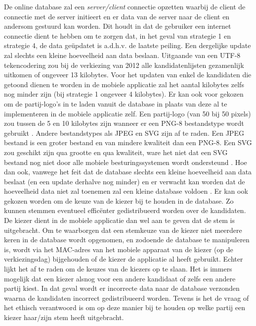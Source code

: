 De online database zal een \textit{server/client} \citep{Chapt17:online} connectie opzetten waarbij de client de connectie met de server initieert en er data van de server naar de client en andersom gestuurd kan worden. Dit houdt in dat de gebruiker een internet connectie dient te hebben om te zorgen dat, in het geval van strategie 1 en strategie 4, de data ge\"{u}pdatet is a.d.h.v. de laatste peiling. Een dergelijke update zal slechts een kleine hoeveelheid aan data beslaan. Uitgaande van een UTF-8 tekencodering \citep{yergeau2003utf} zou bij de verkiezing van 2012 alle kandidatenlijsten gezamenlijk uitkomen of ongeveer 13 kilobytes. Voor het updaten van enkel de kandidaten die getoond dienen te worden in de mobiele applicatie zal het aantal kilobytes zelfs nog minder zijn (bij strategie 1 ongeveer 4 kilobytes). Er kan ook voor gekozen om de partij-logo's in te laden vanuit de database in plaats van deze al te implementeren in de mobiele applicatie zelf.  Een partij-logo (van 50 bij 50 pixels) zou tussen de 5 en 10 kilobytes zijn wanneer er een PNG-8 bestandstype wordt gebruikt \citep{image39:online,miano1999compressed}. Andere bestandstypes als JPEG en SVG zijn af te raden. Een JPEG bestand is een groter bestand en van mindere kwaliteit dan een PNG-8. Een SVG zou geschikt zijn qua grootte en qua kwaliteit, ware het niet dat een SVG bestand nog niet door alle mobiele besturingssystemen wordt ondersteund \citep{CanIu25:online}. Hoe dan ook, vanwege het feit dat de database slechts een kleine hoeveelheid aan data beslaat (en een update derhalve nog minder) en er verwacht kan worden dat de hoeveelheid data niet zal toenemen zal een kleine database voldoen \citep{silberschatz1997database}. Er kan ook gekozen worden om de keuze van de kiezer bij te houden in de database. Zo kunnen stemmen eventueel effic\"{e}nter gedistribueerd worden over de kandidaten. De kiezer dient in de mobiele applicatie dan wel aan te geven dat de stem is uitgebracht. Om te waarborgen dat een stemkeuze van de kiezer niet meerdere keren in de database wordt opgenomen, en zodoende de database te manipuleren is, wordt via het MAC-adres van het mobiele apparaat van de kiezer (op de verkiezingsdag) bijgehouden of de kiezer de applicatie al heeft gebruikt. Echter lijkt het af te raden om de keuzes van de kiezers op te slaan. Het is immers mogelijk dat een kiezer alsnog voor een andere kandidaat of zelfs een andere partij kiest. In dat geval wordt er incorrecte data naar de database verzonden waarna de kandidaten incorrect gedistribueerd worden. Tevens is het de vraag of het ethisch verantwoord is om op deze manier bij te houden op welke partij een kiezer haar/zijn stem heeft uitgebracht.

